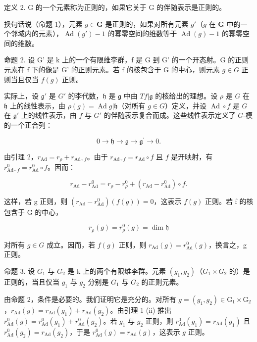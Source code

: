 定义 2. G 的一个元素称为正则的，如果它关于 G 的伴随表示是正则的。

换句话说（命题 1），元素 \(g \in \mathbf{G}\) 是正则的，如果对所有元素 \(g'\)（\(g\) 在 \(\mathbf{G}\) 中的一个邻域内的元素），\(\operatorname{Ad}(g') - 1\) 的幂零空间的维数等于 \(\operatorname{Ad}(g) - 1\) 的幂零空间的维数。

命题 2. 设 G' 是 k 上的一个有限维李群，f 是 G 到 G' 的一个开态射。G 的正则元素在 f 下的像是 G' 的正则元素。若 f 的核包含于 G 的中心，则元素 \(g \in G\) 正则当且仅当 \(f(g)\) 正则。

实际上，设 \(\mathfrak{g}'\) 是 \(G'\) 的李代数，\(\mathfrak{h}\) 是 \(\mathfrak{g}\) 中由 \(Tf|\mathfrak{g}\) 的核给出的理想。设 \(\rho\) 是 \(G\) 在 \(\mathfrak{h}\) 上的线性表示，由 \(\rho(g) = \operatorname{Ad} g|\mathfrak{h}\)（对所有 \(g \in G\)）定义，并设 \(\operatorname{Ad} \circ f\) 是 \(G\) 在 \(\mathfrak{g}'\) 上的线性表示，由 \(f\) 与 \(G'\) 的伴随表示复合而成。这些线性表示定义了 \(G\)-模的一个正合列：

\[
0 \to \mathfrak {h} \to \mathfrak {g} \to \mathfrak {g} ^ {\prime} \to 0.
\]

由引理 2，\(r_{\mathrm{Ad}} = r_{\rho} + r_{\mathrm{Ad}\circ f}\)。由于 \(r_{\mathrm{Ad}\circ f} = r_{\mathrm{Ad}}\circ f\) 且 \(f\) 是开映射，有 \(r_{\mathrm{Ad}\circ f}^{0} = r_{\mathrm{Ad}}^{0}\circ f\)。因而：

\[
r _ {\mathrm{Ad}} - r _ {\mathrm{Ad}} ^ {0} = r _ {\rho} - r _ {\rho} ^ {0} + \left(r _ {\mathrm{Ad}} - r _ {\mathrm{Ad}} ^ {0}\right) \circ f.
\]

这样，若 g 正则，则 \((r_{\mathrm{Ad}} - r_{\mathrm{Ad}}^{0})(f(g)) = 0\)，这表示 \(f(g)\) 正则。若 f 的核包含于 G 的中心，

\[
r _ {\rho} (g) = r _ {\rho} ^ {0} (g) = \dim \mathfrak {h}
\]

对所有 \(g \in G\) 成立。因而，若 \(f(g)\) 正则，则 \(r_{\mathrm{Ad}}(g) = r_{\mathrm{Ad}}^{0}(g)\)，换言之，g 正则。

命题 3. 设 \(G_{1}\) 与 \(G_{2}\) 是 k 上的两个有限维李群。元素 \((g_{1}, g_{2})\)（\(G_{1} \times G_{2}\) 的）是正则的，当且仅当 \(g_{1}\) 与 \(g_{2}\) 分别是 \(G_{1}\) 与 \(G_{2}\) 的正则元素。

由命题 2，条件是必要的。我们证明它是充分的。对所有 \(g = (g_{1}, g_{2}) \in \mathrm{G}_{1} \times \mathrm{G}_{2}\)，\(r_{\mathrm{Ad}}(g) = r_{\mathrm{Ad}}(g_{1}) + r_{\mathrm{Ad}}(g_{2})\)。由引理 1 (ii) 推出 \(r_{\mathrm{Ad}}^{0}(g) = r_{\mathrm{Ad}}^{0}(g_{1}) + r_{\mathrm{Ad}}^{0}(g_{2})\)。若 \(g_{1}\) 与 \(g_{2}\) 正则，则 \(r_{\mathrm{Ad}}^{0}(g_{1}) = r_{\mathrm{Ad}}(g_{1})\) 且 \(r_{\mathrm{Ad}}^{0}(g_{2}) = r_{\mathrm{Ad}}(g_{2})\)，于是 \(r_{\mathrm{Ad}}^{0}(g) = r_{\mathrm{Ad}}(g)\)，这表示 \(g\) 正则。

